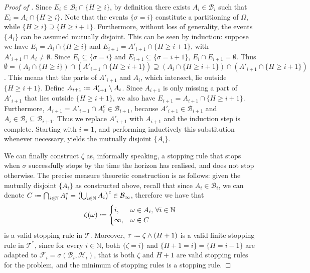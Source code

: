 \documentclass[11pt, a4paper, twoside]{article}
\newcommand*{\defeq}{\mathrel{\vcenter{\baselineskip0.5ex \lineskiplimit0pt
			\hbox{\scriptsize.}\hbox{\scriptsize.}}}=}
\newcommand{\NN}{\mathbb{N}}
\newcommand{\TT}{\mathcal{T}}
\newcommand{\FF}{\mathcal{F}}
\newcommand{\HH}{\mathcal{H}}
\newcommand{\DF}{\mathcal{B}}
\numberwithin{equation}{section}
\begin{document}
\begin{proof}[Proof of ]
		Since $E_i\in\DF_i\cap\{H\ge i\}$, by definition there exists $A_i\in\DF_i$ such that $E_i=A_i\cap \{H\ge i\}$. Note that the events $\{\sigma=i\}$ constitute a partitioning of $\Omega$, while $\{H\ge i\}\supseteq\{H\ge i+1\}$. Furthermore, without loss of generality, the events $\{A_i\}$ can be assumed mutually disjoint. This can be seen by induction: suppose we have $E_i=A_i\cap \{H\ge i\}$ and $E_{i+1}=A'_{i+1}\cap \{H\ge i+1\}$, with $A'_{i+1}\cap A_i\neq\emptyset$. Since $E_i\subseteq\{\sigma=i\}$ and $E_{i+1}\subseteq\{\sigma=i+1\}$, $E_i\cap E_{i+1}=\emptyset$. Thus $\emptyset=(A_i\cap\{H\ge i\})\cap(A'_{i+1}\cap\{H\ge i+1\})\supseteq(A_i\cap\{H\ge i+1\})\cap(A'_{i+1}\cap\{H\ge i+1\})$. This means that the parts of $A'_{i+1}$ and $A_i$, which intersect, lie outside $\{H\ge i+1\}$. Define $A_{i+1}\defeq A'_{i+1}\setminus A_i$. Since $A_{i+1}$ is only missing a part of $A'_{i+1}$ that lies outside $\{H\ge i+1\}$, we also have $E_{i+1}=A_{i+1}\cap\{H\ge i+1\}$. Furthermore, $A_{i+1}=A'_{i+1}\cap A_i^c\in\DF_{i+1}$, because $A'_{i+1}\in\DF_{i+1}$ and $A_i\in\DF_i\subseteq\DF_{i+1}$. Thus we replace $A'_{i+1}$ with $A_{i+1}$ and the induction step is complete. Starting with $i=1$, and performing inductively this substitution whenever necessary, yields the mutually disjoint $\{A_i\}$.
		
		We can finally construct $\zeta$ as, informally speaking, a stopping rule that stops when $\sigma$ successfully stops by the time the horizon has realised, and does not stop otherwise. The precise measure theoretic construction is as follows: given the mutually disjoint $\{A_i\}$ as constructed above, recall that since $A_i\in\DF_i$, we can denote $C\defeq\bigcap_{i\in\NN}A_i^c=\left(\bigcup_{i\in\NN}A_i\right)^c\in\DF_\infty$, therefore we have that
		\begin{equation}\label{equivstopapp}
			\zeta(\omega)\defeq\begin{cases}i,&\omega\in A_i,\,\forall i\in\NN\\
			\infty,&\omega\in C\end{cases}
		\end{equation}
		is a valid stopping rule in $\TT$. Moreover, $\tau\defeq \zeta\wedge(H+1)$ is a valid finite stopping rule in $\TT^*$, since for every $i\in\NN$, both $\{\zeta=i\}$ and $\{H+1=i\}=\{H=i-1\}$ are adapted to $\FF_i=\sigma(\DF_i,\HH_{i})$, that is both $\zeta$ and $H+1$ are valid stopping rules for the problem, and the minimum of stopping rules is a stopping rule.
		

\end{proof}
\end{document}

